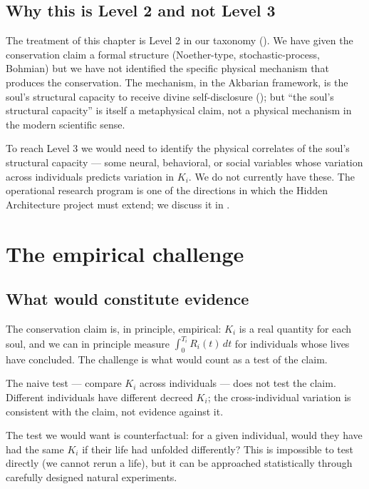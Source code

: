 \subsection{Why this is Level 2 and not Level 3}

The treatment of this chapter is Level 2 in our taxonomy
(). We have given the conservation claim a
formal structure (Noether-type, stochastic-process, Bohmian) but we
have not identified the specific physical mechanism that produces
the conservation. The mechanism, in the Akbarian framework, is the
soul's structural capacity to receive divine self-disclosure
(); but ``the soul's structural capacity''
is itself a metaphysical claim, not a physical mechanism in the
modern scientific sense.

To reach Level 3 we would need to identify the physical
correlates of the soul's structural capacity --- some neural,
behavioral, or social variables whose variation across individuals
predicts variation in $K_i$. We do not currently have these. The
operational research program is one of the directions in which the
Hidden Architecture project must extend; we discuss it in
.

\section{The empirical challenge}
\label{sec:rizq-empirical}

\subsection{What would constitute evidence}

The conservation claim is, in principle, empirical: $K_i$ is a real
quantity for each soul, and we can in principle measure
$\int_0^{T_i} R_i(t)\, dt$ for individuals whose lives have
concluded. The challenge is what would count as a test of the
claim.

The naive test --- compare $K_i$ across individuals --- does not
test the claim. Different individuals have different decreed
$K_i$; the cross-individual variation is consistent with the claim,
not evidence against it.

The test we would want is counterfactual: for a given individual,
would they have had the same $K_i$ if their life had unfolded
differently? This is impossible to test directly (we cannot rerun a
life), but it can be approached statistically through carefully
designed natural experiments.

